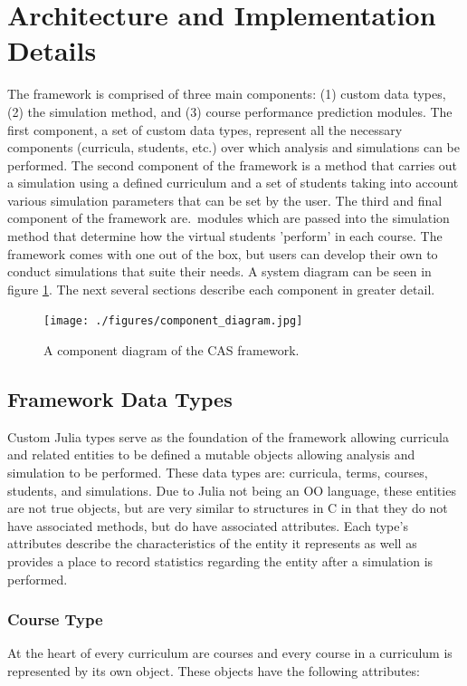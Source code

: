 \documentclass[botnum, fleqn]{unmeethesis}
\begin{document}
  \section{Architecture and Implementation Details}
  The framework is comprised of three main components: (1) custom data types, (2) the simulation method, and (3) course performance prediction modules. The first component, a set of custom data types, represent all the necessary components (curricula, students, etc.) over which analysis and simulations can be performed. The second component of the framework is a method that carries out a simulation using a defined curriculum and a set of students taking into account various simulation parameters that can be set by the user. The third and final component of the framework are.\ modules which are passed into the simulation method that determine how the virtual students 'perform' in each course. The framework comes with one out of the box, but users can develop their own to conduct simulations that suite their needs. A system diagram can be seen in figure \ref{fig:component_diagram}. The next several sections describe each component in greater detail.

  \begin{figure}[h!]
    \centerline{\texttt{[image: ./figures/component\_diagram.jpg]}}
    \caption{A component diagram of the CAS framework.} 
    \label{fig:component_diagram}
  \end{figure}

    \subsection{Framework Data Types}
    Custom Julia types serve as the foundation of the framework allowing curricula and related entities to be defined a mutable objects allowing analysis and simulation to be performed. These data types are: curricula, terms, courses, students, and simulations. Due to Julia not being an OO language, these entities are not true objects, but are very similar to structures in C in that they do not have associated methods, but do have associated attributes. Each type's attributes describe the characteristics of the entity it represents as well as provides a place to record statistics regarding the entity after a simulation is performed.

    \subsubsection{Course Type}
    At the heart of every curriculum are courses and every course in a curriculum is represented by its own object. These objects have the following attributes:
\end{document}
